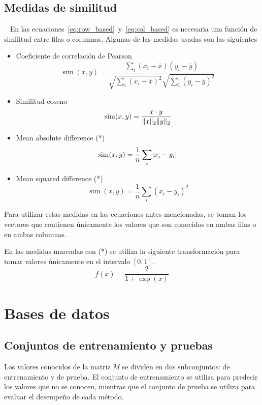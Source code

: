 \documentclass[spanish]{article}                 %
\numberwithin{equation}{section}                 %
\theoremstyle{definition}
\DeclarePairedDelimiter\abs{\lvert}{\rvert}           %
\DeclarePairedDelimiter\norm{\lVert}{\rVert}          %
\DeclareMathOperator{\Sim}{sim} %
\begin{document}
\subsection{Medidas de similitud}~\label{sec:medidas_similitud}
En las ecuaciones~\ref{eq:row_based}~y~\ref{eq:col_based} es necesaria una función de similitud entre filas o columnas. Algunas de las medidas usadas son las siguientes

\begin{itemize}
    \item Coeficiente de correlación de Pearson
        \begin{equation*}
            \Sim(x, y) = \frac{\sum_{i}^{}\left(x_i - \bar x \right) \left(y_i - \bar y \right)}{\sqrt{\sum_{i}^{} \left(x_i - \bar x\right)^2}\sqrt{\sum_{i}^{} \left(y_i - \bar y \right)^2}}
        \end{equation*}
    \item Similitud coseno
        \begin{equation*}
            \Sim(x, y) = \frac{x \cdot y}{\norm{x}_2 \norm{y}_2}
        \end{equation*}
    \item Mean absolute difference (*)
        \begin{equation*}
            \Sim(x, y) = \frac{1}{n}\sum_{i}^{} \abs{x_i - y_i}
        \end{equation*}
    \item Mean squared difference (*)
        \begin{equation*}
            \Sim(x, y) = \frac{1}{n}\sum_{i}^{} (x_i - y_i)^2
        \end{equation*}
\end{itemize}
    
Para utilizar estas medidas en las ecuaciones antes mencionadas, se toman los vectores que contienen únicamente los valores que son conocidos en ambas filas o en ambas columnas.

En las medidas marcadas con (*) se utiliza la siguiente transformación para tomar valores únicamente en el intervalo $[0, 1]$.
\begin{equation*}
    f(x) = \frac{2}{1 + \exp(x)}
\end{equation*}

\section{Bases de datos}

\subsection{Conjuntos de entrenamiento y pruebas}
Los valores conocidos de la matriz $M$ se dividen en dos subconjuntos: de entrenamiento y de prueba. El conjunto de entrenamiento se utiliza para predecir los valores que no se conocen, mientras que el conjunto de prueba se utiliza para evaluar el desempeño de cada método.
\end{document}
